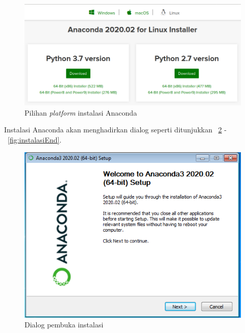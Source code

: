 \begin{figure}[h!]
  \begin{center}
    \includegraphics[scale=.5]{pics/anacondaInstall0.png}
    \caption{Pilihan \textit{platform} instalasi Anaconda}
    \label{fig:platformAnaconda}
  \end{center}
\end{figure}

Instalasi Anaconda akan menghadirkan dialog seperti ditunjukkan \figurename~\ref{fig:pembuka} - \figurename~\ref{fig:instalasiEnd}.

\begin{figure}[h!]
  \begin{center}
    \includegraphics[scale=.5]{pics/anacondaInstall1.png}
    \caption{Dialog pembuka instalasi}
    \label{fig:pembuka}
  \end{center}
\end{figure}

